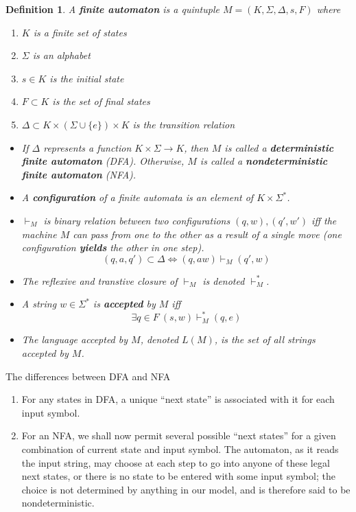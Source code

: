 \documentclass[aps,pra,onecolumn,notitlepage,superscriptaddress]{revtex4-1}
\def\y{\vdash}
\def\ys{\vdash^*}
\newtheorem{defi}{Definition}
\begin{document}
    \begin{defi}
        A \textbf{finite automaton} is a quintuple $M = (K, \Sigma, \Delta, s, F)$ where 
        \begin{enumerate}
            \item $K$ is a finite set of states
            \item $\Sigma$ is an alphabet
            \item $s \in K$ is the initial state
            \item $F \subset K$ is the set of final states
            \item $\Delta \subset K \times (\Sigma \cup \{e\}) \times K$ is the transition relation
        \end{enumerate}

        \begin{itemize}
            \item If $\Delta$ represents a function $K \times \Sigma \to K$, then $M$ is called a \textbf{deterministic finite automaton} (DFA). Otherwise, $M$ is called a \textbf{nondeterministic finite automaton} (NFA).
            \item A \textbf{configuration} of a finite automata is an element of $K \times \Sigma^*$. 
            \item $\y_M$ is binary relation between two configurations $(q,w), (q', w')$ iff the machine $M$ can pass from one to the other as a result of a single move (one configuration \textbf{yields} the other in one step).
            \begin{equation}
                (q,a,q') \subset \Delta
                \Longleftrightarrow (q,aw) \y_M (q',w)
            \end{equation}
            \item The reflexive and transtive closure of $\y_M$ is denoted $\ys_M$. 
            \item A string $w \in \Sigma^*$ is \textbf{accepted} by $M$ iff
            \begin{equation}
                \exists q \in F \ (s,w) \ys_M (q,e)
            \end{equation}
            \item The language accepted by $M$, denoted $L(M)$, is the set of all strings accepted by $M$.
        \end{itemize}
    \end{defi}

    The differences between DFA and NFA
    \begin{enumerate}
        \item For any states in DFA, a unique ``next state'' is associated with it for each input symbol.
        \item For an NFA, we shall now permit several possible ``next states'' for a given combination of current state and input symbol. The automaton, as it reads the input string, may choose at each step to go into anyone of these legal next states, or there is no state to be entered with some input symbol; the choice is not determined by anything in our model, and is therefore said to be nondeterministic.
    \end{enumerate}
\end{document}
